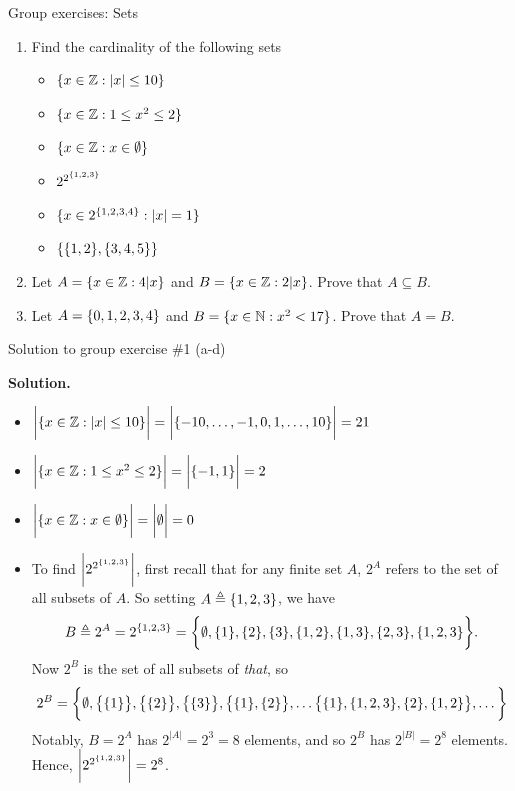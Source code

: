 \documentclass[10pt]{beamer}
\begin{document}
\begin{frame}{Group exercises: Sets}


\begin{enumerate}
\item Find the cardinality of the following sets
\begin{itemize}
\item[a)] $\{ {x \in \mathbb{Z}: |x| \leq 10} \}$
\item[b)] $\{ {x \in \mathbb{Z}: 1 \leq x^2 \leq 2} \}$
\item[c)] $\{ {x \in \mathbb{Z}: x \in \emptyset} \}$
\item[d)] $2^{2^{\{ {1,2,3} \}}}$
\item[e)] $\{ {x \in 2^{\{ {1,2,3,4} \}}: |x|=1} \}$
\item[f)] $\{ {\{ {1,2} \}, \{ {3,4,5} \}} \}$
\end{itemize}
\item Let $A= \{ {x \in \mathbb{Z}: 4|x} \}$ and  $B= \{ {x \in \mathbb{Z}: 2|x} \}$.  Prove that $A \subseteq B$.
\item Let $A= \{ {0,1,2,3,4} \}$ and  $B= \{ {x \in \mathbb{N}: x^2<17} \}$.  Prove that $A=B$.
\end{enumerate}

\end{frame}



\begin{frame}{Solution to group exercise \#1 (a-d)}

\small 
\textbf{Solution.}

\begin{itemize}
\item[a)] $\bigg|\{ {x \in \mathbb{Z}: |x| \leq 10} \}\bigg|=\bigg| \{ {-10, \hdots, -1, 0, 1, \hdots, 10} \} \bigg| = 21$
\item[b)] $\bigg|\{ {x \in \mathbb{Z}: 1 \leq x^2 \leq 2} \}\bigg| = \bigg| \{ {-1, 1} \} \bigg| = 2 $
\item[c)] $\bigg| \{ {x \in \mathbb{Z}: x \in \emptyset} \} \bigg| = \bigg| \emptyset \bigg| = 0 $
\item[d)] To find $\bigg|2^{2^{\{ {1,2,3} \}}}\bigg|$, first recall that for any finite set $A$, $2^A$ refers to the set of all subsets of $A$. So setting $A \triangleq \{ {1,2,3} \}$, we have 
\[ B \triangleq 2^A = 2^{\{ {1,2,3} \}} = \bigg\{ \emptyset, \{ {1} \}, \{ {2} \}, \{ {3} \}, \{ {1,2} \}, \{ {1,3} \}, \{ {2,3} \}, \{ {1,2,3} \} \bigg\}. \]
Now  $2^B$ is the set of all subsets of \textit{that}, 
so
\[2^B = \bigg\{ \emptyset,  \big\{ \{ {1} \}  \big\}, \big\{ \{ {2} \} \big\}, \big\{  \{ {3} \} \big\} , \big\{  \{ {1} \},\{ {2} \} \big\}, \hdots  \big\{  \{ {1} \}, \{ {1,2,3} \}, \{ {2} \}, \{ {1,2} \} \big\} , \hdots \bigg\}  \]
Notably, $B=2^A$ has $2^{|A|} = 2^3=8$ elements, and so $2^B$ has $2^{|B|} = 2^8$ elements. Hence,  $\bigg|2^{2^{\{ {1,2,3} \}}}\bigg| = 2^8$.
\end{itemize}


\end{frame}
\end{document}
